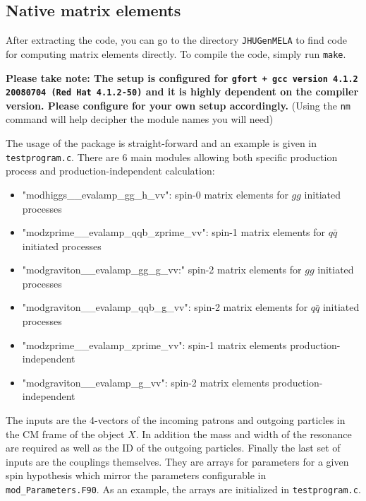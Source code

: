 \documentclass[aps,superscriptaddress,nofootinbib]{revtex4}
\begin{document}
\subsection{Native matrix elements}

After extracting the code, you can go to the directory \verb|JHUGenMELA| to find code for computing matrix elements directly.
To compile the code, simply run \texttt{make}.

\textbf{Please take note: The setup is configured for \texttt{gfort + gcc version 4.1.2 20080704 (Red Hat 4.1.2-50)} and it is highly dependent on the compiler version.  Please configure for your own setup accordingly.}  (Using the \verb|nm| command will help decipher the module names you will need)

The usage of the package is straight-forward and an example is given in \verb|testprogram.c|.
There are 6 main modules allowing both specific production process and production-independent calculation:
\begin{itemize}
\item "modhiggs\_\_evalamp\_gg\_h\_vv": spin-0 matrix elements for $gg$ initiated processes
\item "modzprime\_\_evalamp\_qqb\_zprime\_vv": spin-1 matrix elements for $q\bar{q}$ initiated processes
\item "modgraviton\_\_evalamp\_gg\_g\_vv:" spin-2 matrix elements for $gg$ initiated processes
\item "modgraviton\_\_evalamp\_qqb\_g\_vv": spin-2 matrix elements for $q\bar{q}$ initiated processes
\item "modzprime\_\_evalamp\_zprime\_vv": spin-1 matrix elements production-independent
\item "modgraviton\_\_evalamp\_g\_vv": spin-2 matrix elements production-independent

\end{itemize}

The inputs are the 4-vectors of the incoming patrons and outgoing particles in the CM frame of the object $X$.
In addition the mass and width of the resonance are required as well as the ID of the outgoing particles.
Finally the last set of inputs are the couplings themselves.  They are arrays for parameters for a given spin hypothesis
which mirror the parameters configurable in \verb|mod_Parameters.F90|.
As an example, the arrays are initialized in \verb|testprogram.c|.
\end{document}
